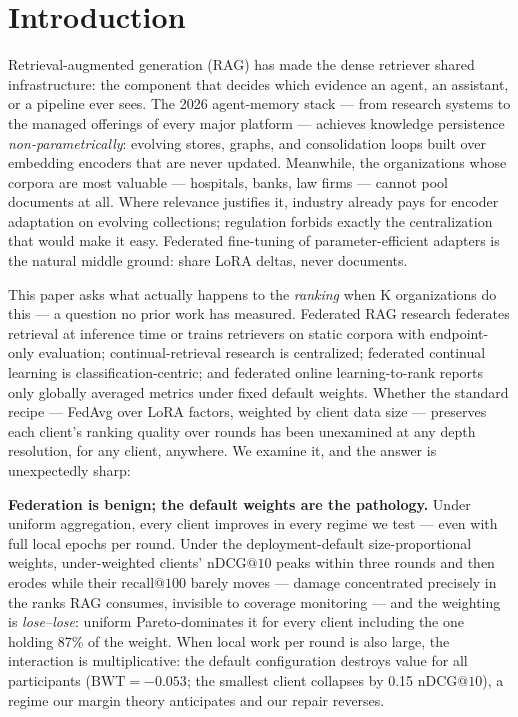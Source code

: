 \documentclass[sigconf,anonymous,review]{acmart}
\makeatletter
\newcommand{\ndcg}{\mathrm{nDCG@10}}
\newcommand{\rc}[1]{\mathrm{recall@#1}}
\newcommand{\BWT}{\mathrm{BWT}}
\makeatother
\begin{document}
\maketitle

\section{Introduction}
Retrieval-augmented generation (RAG) has made the dense retriever shared infrastructure: the component that decides which evidence an agent, an assistant, or a pipeline ever sees. The 2026 agent-memory stack --- from research systems to the managed offerings of every major platform --- achieves knowledge persistence \emph{non-parametrically}: evolving stores, graphs, and consolidation loops built over embedding encoders that are never updated. Meanwhile, the organizations whose corpora are most valuable --- hospitals, banks, law firms --- cannot pool documents at all. Where relevance justifies it, industry already pays for encoder adaptation on evolving collections; regulation forbids exactly the centralization that would make it easy. Federated fine-tuning of parameter-efficient adapters is the natural middle ground: share LoRA deltas, never documents.

This paper asks what actually happens to the \emph{ranking} when K organizations do this --- a question no prior work has measured. Federated RAG research federates retrieval at inference time or trains retrievers on static corpora with endpoint-only evaluation; continual-retrieval research is centralized; federated continual learning is classification-centric; and federated online learning-to-rank reports only globally averaged metrics under fixed default weights. Whether the standard recipe --- FedAvg over LoRA factors, weighted by client data size --- preserves each client's ranking quality over rounds has been unexamined at any depth resolution, for any client, anywhere. We examine it, and the answer is unexpectedly sharp:

\textbf{Federation is benign; the default weights are the pathology.} Under uniform aggregation, every client improves in every regime we test --- even with full local epochs per round. Under the deployment-default size-proportional weights, under-weighted clients' $\ndcg$ peaks within three rounds and then erodes while their $\rc{100}$ barely moves --- damage concentrated precisely in the ranks RAG consumes, invisible to coverage monitoring --- and the weighting is \emph{lose--lose}: uniform Pareto-dominates it for every client including the one holding 87\% of the weight. When local work per round is also large, the interaction is multiplicative: the default configuration destroys value for all participants ($\BWT=-0.053$; the smallest client collapses by 0.15 $\ndcg$), a regime our margin theory anticipates and our repair reverses.
\end{document}
